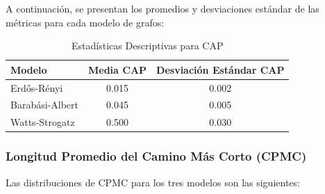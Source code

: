 A continuación, se presentan los promedios y desviaciones estándar de las métricas para cada modelo de grafos:

\begin{table}[ht]
    \centering
    \begin{tabular}{lcc}
    \toprule
    Modelo & Media CAP & Desviación Estándar CAP \\
    \midrule
    Erdős-Rényi & 0.015 & 0.002 \\
    Barabási-Albert & 0.045 & 0.005 \\
    Watts-Strogatz & 0.500 & 0.030 \\
    \bottomrule
    \end{tabular}
    \caption{Estadísticas Descriptivas para CAP}
    \end{table}

\subsubsection{Longitud Promedio del Camino Más Corto (CPMC)}
Las distribuciones de CPMC para los tres modelos son las siguientes:
